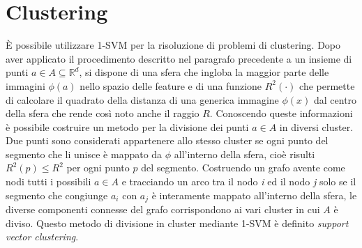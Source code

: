 \documentclass [11pt,a4paper,twoside,openright] {book}
\begin{document}
\section{Clustering}
È possibile utilizzare 1-SVM per la risoluzione di problemi di clustering. Dopo aver applicato il procedimento descritto nel paragrafo precedente a un insieme di punti $a \in A \subseteq \mathbb{R}^d$, si dispone di una sfera che ingloba la maggior parte delle immagini $\phi(a)$ nello spazio delle feature e di una funzione $R^2(\cdot)$ che permette di calcolare il quadrato della distanza di una generica immagine $\phi(x)$ dal centro della sfera che rende così noto anche il raggio $R$. Conoscendo queste informazioni è possibile costruire un metodo per la divisione dei punti $a \in A$ in diversi cluster\cite{ben2001support}. Due punti sono considerati appartenere allo stesso cluster se ogni punto del segmento che li unisce è mappato da $\phi$ all'interno della sfera, cioè risulti $R^2(p) \leq R^2$ per ogni punto $p$ del segmento. Costruendo un grafo avente come nodi tutti i possibili $a \in A$ e tracciando un arco tra il nodo \textit{i} ed  il nodo \textit{j} solo se il segmento che congiunge $a_i$ con $a_j$ è interamente mappato all'interno della sfera, le diverse componenti connesse del grafo corrispondono ai vari cluster in cui $A$ è diviso. Questo metodo di divisione in cluster mediante 1-SVM è definito \textit{support vector clustering}.
\end{document}
